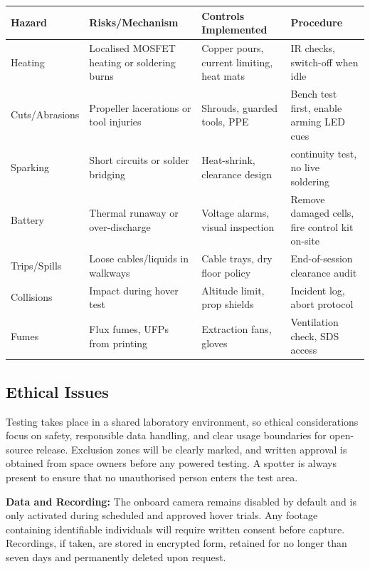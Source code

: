 \begin{tabular}{|p{2.3cm}|p{4.5cm}|p{4cm}|p{3.8cm}|}
\hline
\rowcolor{gray!15}\textbf{Hazard} & \textbf{Risks/Mechanism} & \textbf{Controls Implemented} & \textbf{Procedure} \\ \hline
Heating & Localised MOSFET heating or soldering burns & Copper pours, current limiting, heat mats & IR checks, switch-off when idle \\ \hline
Cuts/Abrasions & Propeller lacerations or tool injuries & Shrouds, guarded tools, PPE & Bench test first, enable arming LED cues \\ \hline
Sparking & Short circuits or solder bridging & Heat-shrink, clearance design & continuity test, no live soldering \\ \hline
Battery & Thermal runaway or over-discharge & Voltage alarms, visual inspection & Remove damaged cells, fire control kit on-site \\ \hline
Trips/Spills & Loose cables/liquids in walkways & Cable trays, dry floor policy & End-of-session clearance audit \\ \hline
Collisions & Impact during hover test & Altitude limit, prop shields & Incident log, abort protocol \\ \hline
Fumes & Flux fumes, UFPs from printing & Extraction fans, gloves & Ventilation check, SDS access \\ \hline
\end{tabular}

\subsection{Ethical Issues}
Testing takes place in a shared laboratory environment, so ethical considerations focus on safety, responsible data handling, and clear usage boundaries for open-source release. Exclusion zones will be clearly marked, and written approval is obtained from space owners before any powered testing. A spotter is always present to ensure that no unauthorised person enters the test area.

\vspace{0.5em}
\textbf{Data and Recording:}  
The onboard camera remains disabled by default and is only activated during scheduled and approved hover trials. Any footage containing identifiable individuals will require written consent before capture. Recordings, if taken, are stored in encrypted form, retained for no longer than seven days and permanently deleted upon request.

